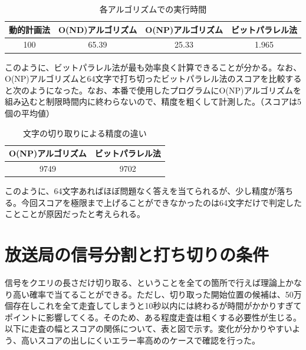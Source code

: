 \documentclass[dvipdfmx]{jsarticle}
\begin{document}
\begin{table}[H]
  \centering
  \begin{tabular}{c|c|c|c}
    動的計画法 & O(ND)アルゴリズム & O(NP)アルゴリズム & ビットパラレル法 \\ \hline\hline
    100 & 65.39 & 25.33 & 1.965 \\ \hline
  \end{tabular}
  \caption{各アルゴリズムでの実行時間}
\end{table}

このように、ビットパラレル法が最も効率良く計算できることが分かる。なお、O(NP)アルゴリズムと64文字で打ち切ったビットパラレル法のスコアを比較すると次のようになった。なお、本番で使用したプログラムにO(NP)アルゴリズムを組み込むと制限時間内に終わらないので、精度を粗くして計測した。（スコアは5個の平均値）

\begin{table}[H]
  \centering
  \begin{tabular}{c|c}
    O(NP)アルゴリズム & ビットパラレル法 \\ \hline\hline
    9749 & 9702 \\ \hline
  \end{tabular}
  \caption{文字の切り取りによる精度の違い}
\end{table}

このように、64文字あればほぼ問題なく答えを当てられるが、少し精度が落ちる。今回スコアを極限まで上げることができなかったのは64文字だけで判定したことことが原因だったと考えられる。

\section{放送局の信号分割と打ち切りの条件}

信号をクエリの長さだけ切り取る、ということを全ての箇所で行えば理論上かなり高い確率で当てることができる。ただし、切り取った開始位置の候補は、50万個存在しこれを全て走査してしまうと10秒以内には終わるが時間がかかりすぎてポイントに影響してくる。そのため、ある程度走査は粗くする必要性が生じる。以下に走査の幅とスコアの関係について、表と図で示す。変化が分かりやすいよう、高いスコアの出しにくいエラー率高めのケースで確認を行った。
\end{document}
